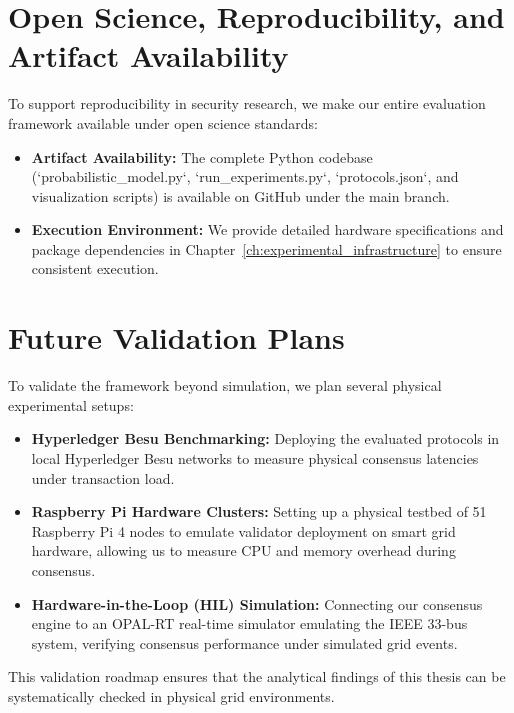 \documentclass[12pt, oneside, a4paper]{report}
\theoremstyle{definition}
\theoremstyle{remark}
\begin{document}
\section{Open Science, Reproducibility, and Artifact Availability}
\label{sec:tv:open_science}
To support reproducibility in security research, we make our entire evaluation framework available under open science standards:
\begin{itemize}
  \item \textbf{Artifact Availability:} The complete Python codebase (`probabilistic_model.py`, `run_experiments.py`, `protocols.json`, and visualization scripts) is available on GitHub under the main branch.
  \item \textbf{Execution Environment:} We provide detailed hardware specifications and package dependencies in Chapter~\ref{ch:experimental_infrastructure} to ensure consistent execution.
\end{itemize}

\section{Future Validation Plans}
\label{sec:tv:future_validation}
To validate the framework beyond simulation, we plan several physical experimental setups:
\begin{itemize}
  \item \textbf{Hyperledger Besu Benchmarking:} Deploying the evaluated protocols in local Hyperledger Besu networks to measure physical consensus latencies under transaction load.
  \item \textbf{Raspberry Pi Hardware Clusters:} Setting up a physical testbed of 51 Raspberry Pi 4 nodes to emulate validator deployment on smart grid hardware, allowing us to measure CPU and memory overhead during consensus.
  \item \textbf{Hardware-in-the-Loop (HIL) Simulation:} Connecting our consensus engine to an OPAL-RT real-time simulator emulating the IEEE 33-bus system, verifying consensus performance under simulated grid events.
\end{itemize}
This validation roadmap ensures that the analytical findings of this thesis can be systematically checked in physical grid environments.



\cleardoublepage


﻿%
\end{document}
